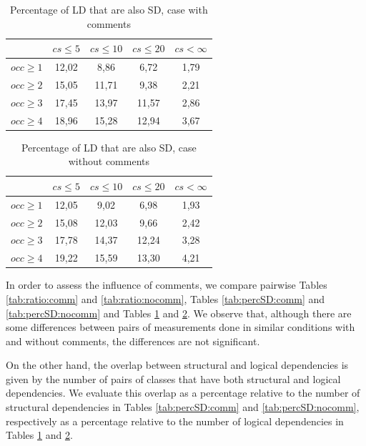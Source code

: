 \documentclass[12pt]{mitthesis}
\begin{document}
\begin{table}[!h]
\renewcommand{\arraystretch}{1}
\caption{Percentage of LD that are also SD, case with comments}
\label{tab:percLD:comm}
\centering

\begin{tabular}{|c|c|c|c|c|}
\hline
	      &	$cs\leq 5$	&	$cs\leq 10$	&	$cs\leq 20$	&	$cs< \infty$	\\
\hline
$occ\geq 1$	&	12,02	&	8,86	&	6,72	&	1,79	\\
$occ\geq 2$	&	15,05	&	11,71	&	9,38	&	2,21	\\
$occ\geq 3$	&	17,45	&	13,97	&	11,57	&	2,86	\\
$occ\geq 4$	&	18,96	&	15,28	&	12,94	&	3,67	\\
\hline
\end{tabular}
\end{table}

\begin{table}[!h]
\renewcommand{\arraystretch}{1}
\caption{Percentage of LD that are also SD, case without comments}
\label{tab:percLD:nocomm}
\centering
\begin{tabular}{|c|c|c|c|c|}
\hline
	      &	$cs\leq 5$	&	$cs\leq 10$	&	$cs\leq 20$	&	$cs< \infty$	\\
\hline
$occ\geq 1$	&	12,05	&	9,02	&	6,98	&	1,93	\\
$occ\geq 2$	&	15,08	&	12,03	&	9,66	&	2,42	\\
$occ\geq 3$	&	17,78	&	14,37	&	12,24	&	3,28	\\
$occ\geq 4$	&	19,22	&	15,59	&	13,30	&	4,21	\\
\hline
\end{tabular}
\end{table}

In order to assess the influence of comments, we compare pairwise Tables \ref{tab:ratio:comm} and \ref{tab:ratio:nocomm},  
Tables \ref{tab:percSD:comm} and \ref{tab:percSD:nocomm} and Tables \ref{tab:percLD:comm} and \ref{tab:percLD:nocomm}. 
We observe that, although there are some differences between pairs of measurements done in similar conditions with and without comments, the differences are not significant.

On the other hand, the overlap between structural and logical dependencies is given by the number of pairs of classes that have both structural and logical dependencies. We evaluate this overlap as a percentage relative to the number of structural dependencies in Tables \ref{tab:percSD:comm} and \ref{tab:percSD:nocomm}, respectively as  a percentage relative to the number of logical dependencies in Tables \ref{tab:percLD:comm} and \ref{tab:percLD:nocomm}.
\end{document}
